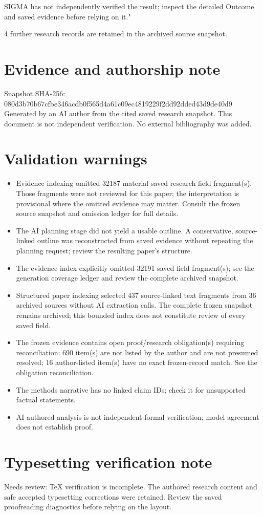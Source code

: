 \documentclass[11pt]{article}
\begin{document}
SIGMA has not independently verified the result; inspect the detailed Outcome and saved evidence before relying on it."

4 further research records are retained in the archived source snapshot.
\section*{Evidence and authorship note}
Snapshot SHA-256: 080d3b70b67cfbe346acdb0f565d4a61c09ec4819229f2dd92dded43d9de40d9
Generated by an AI author from the cited saved research snapshot. This document is not independent verification. No external bibliography was added.
\section*{Validation warnings}
\begin{itemize}
\item Evidence indexing omitted 32187 material saved research field fragment(s). Those fragments were not reviewed for this paper; the interpretation is provisional where the omitted evidence may matter. Consult the frozen source snapshot and omission ledger for full details.
\item The AI planning stage did not yield a usable outline. A conservative, source-linked outline was reconstructed from saved evidence without repeating the planning request; review the resulting paper's structure.
\item The evidence index explicitly omitted 32191 saved field fragment(s); see the generation coverage ledger and review the complete archived snapshot.
\item Structured paper indexing selected 437 source-linked text fragments from 36 archived sources without AI extraction calls. The complete frozen snapshot remains archived; this bounded index does not constitute review of every saved field.
\item The frozen evidence contains open proof/research obligation(s) requiring reconciliation: 690 item(s) are not listed by the author and are not presumed resolved; 16 author-listed item(s) have no exact frozen-record match. See the obligation reconciliation.
\item The methods narrative has no linked claim IDs; check it for unsupported factual statements.
\item AI-authored analysis is not independent formal verification; model agreement does not establish proof.
\end{itemize}
\section*{Typesetting verification note}
Needs review: TeX verification is incomplete. The authored research content and safe accepted typesetting corrections were retained. Review the saved proofreading diagnostics before relying on the layout.
\end{document}

